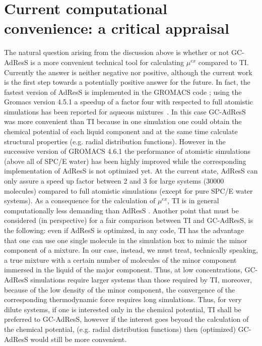\documentclass[a4paper,preprint,unsortedaddress]{revtex4-1}
\newcommand{\recheck}[1]{{\color{red} #1}}
\begin{document}
\section{Current computational convenience: a critical appraisal}
The natural question arising from the discussion above is whether or not GC-AdResS is a more convenient technical tool for calculating $\mu^{ex}$ compared to TI.
Currently the answer is \recheck{neither negative nor positive}, although the current work is the first step towards a potentially positive answer for the future. In fact, the fastest version of AdResS is implemented in the GROMACS code \cite{gromacs}; using the Gromacs version 4.5.1 a speedup of a factor four with respected to full atomistic simulations has been reported for aqueous mixtures~\cite{debashish1,nico-debashish}. In this case GC-AdResS was more convenient than TI because in one simulation one could obtain the chemical potential of each liquid component and at the same time calculate structural properties (e.g. radial distribution functions). However in the successive version of GROMACS 4.6.1 the performance of atomistic simulations (above all of SPC/E water) has been highly improved while the corresponding implementation of AdResS is not optimized yet. At the current state, AdResS can only assure a speed up factor between \recheck{2 and 3} for large systems (30000 molecules) compared to full atomistic simulations \recheck{(except for pure SPC/E water systems)}. As a consequence for the calculation of $\mu^{ex}$, TI is in general computationally less demanding than AdResS . Another point that must be considered (in perspective) for a fair comparison between TI and GC-AdResS, is the following: even if AdResS is optimized, in any code, TI has the advantage that one can use one single molecule in the simulation box to mimic the minor component of a mixture. In our case, instead, we must treat, technically speaking, a true mixture with a certain number of molecules of the minor component immersed in the liquid of the major component. Thus, at low concentrations, GC-AdResS simulations require larger systems than those required by TI, moreover, because of the low density of the minor component, the convergence of the corresponding thermodynamic force requires long simulations. 
Thus, for very dilute systems, if one is interested only in the chemical potential, TI shall be preferred to GC-AdResS, however if the interest goes beyond the calculation of the chemical potential, (e.g. radial distribution functions) then (optimized) GC-AdResS would still be more convenient.
\end{document}
